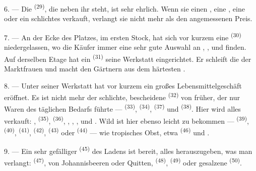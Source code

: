 \VUsaut{4.0mm}
\VUsaut{3.0mm}

6. --- Die  \textsuperscript{(29)}, die neben ihr steht, ist
sehr ehrlich. Wenn sie einen , eine , eine
 oder ein schlichtes  verkauft, verlangt sie nicht mehr als
den angemessenen Preis.

7. --- An der Ecke des Platzes, im ersten Stock, hat sich vor kurzem eine
 \textsuperscript{(30)} niedergelassen, wo die Käufer immer
eine sehr gute Auswahl an , ,
 und  finden. Auf derselben Etage hat ein
 \textsuperscript{(31)} seine Werkstatt eingerichtet. Er
schleift die  der Marktfrauen und macht den Gärtnern
 aus dem härtesten .

\VUsaut{4.0mm}
\VUsaut{3.0mm}

8. --- Unter seiner Werkstatt hat vor kurzem ein großes Lebensmittelgeschäft
eröffnet. Es ist nicht mehr der schlichte, bescheidene 
\textsuperscript{(32)} von früher, der nur Waren des täglichen Bedarfs führte ---
 \textsuperscript{(33)},  \textsuperscript{(34)},
 \textsuperscript{(37)} und  \textsuperscript{(38)}.
Hier wird alles verkauft: , 
\textsuperscript{(35)},  \textsuperscript{(36)}, ,
, ,  und
. Wild ist hier ebenso leicht zu bekommen --- 
\textsuperscript{(39)},  \textsuperscript{(40)},
 \textsuperscript{(41)}, 
\textsuperscript{(42)},  \textsuperscript{(43)} oder
 \textsuperscript{(44)} --- wie tropisches Obst, etwa 
\textsuperscript{(46)} und .

9. --- Ein sehr gefälliger  \textsuperscript{(45)} des Ladens ist
bereit, alles herauszugeben, was man verlangt: 
\textsuperscript{(47)}, von Johannisbeeren oder Quitten, 
\textsuperscript{(48)},  \textsuperscript{(49)} oder gesalzene
 \textsuperscript{(50)}.


